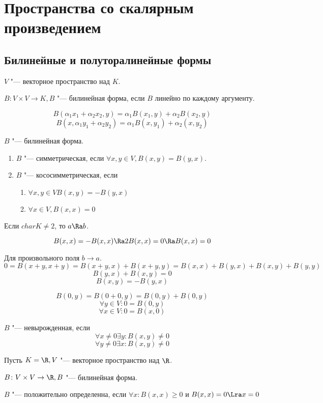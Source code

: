 \chapter{Пространства со скалярным произведением}
\section{Билинейные и полуторалинейные формы}
\begin{Def}
$V$ "--- векторное пространство над $K$. 

$B \colon V \times V \to K, B$ "--- билинейная форма, 
если $B$ линейно по каждому аргументу.

$$B(\alpha_1 x_1 + \alpha_2 x_2, y) = \alpha_1 B(x_1, y) + \alpha_2 B(x_2, y)$$
$$B(x, \alpha_1y_1 + \alpha_2 y_2) = \alpha_1 B(x, y_1) + \alpha_2(x, y_2)$$
\end{Def}
\begin{Def}
$B$ "--- билинейная форма.
    \begin{enumerate}
    \item $B$ "--- симметрическая, если $\forall x, y \in V, B(x, y) = B(y, x)$.
    \item $B$ "--- кососимметрическая, если 
        \begin{enumerate}
        \item $\forall x, y \in V B(x, y) = -B(y, x)$
        \item $\forall x \in V, B(x, x) = 0$
        \end{enumerate}
    \end{enumerate}
\end{Def}
\begin{Rem}
Если $char K \ne 2$, то  $a \Ra b$.

$$B(x, x) = -B(x, x) \Ra 2B(x, x) = 0 \Ra B(x, x) = 0$$
\end{Rem}
\begin{Rem}
Для произвольного поля $b \to a$.
$$0 = B(x + y, x + y) = B(x + y, x) + B(x + y, y) = B(x, x) + B(y, x) + B(x, y) + B(y, y)$$
$$B(y, x) + B(x, y) = 0$$
$$B(x, y) = -B(y, x)$$

$$B(0, y) = B(0 + 0, y) = B(0, y) + B(0, y)$$
$$\forall y \in V \colon 0 = B(0, y)$$
$$\forall x \in V \colon 0 = B(x, 0)$$
\end{Rem}

\begin{Def}
$B$ "--- невырожденная, если 
$$\forall x \ne 0 \exists y \colon B(x, y) \ne 0$$
$$\forall y \ne 0 \exists x \colon B(x, y) \ne 0$$
\end{Def}
\begin{Def}
Пусть $K = \R, V$ "--- векторное пространство над $\R$.

$B \colon V \times V \to \R, B$ "--- билинейная форма.

$B$ "--- положительно определенна, если 
$\forall x\colon B(x, x) \ge 0$ и $B(x, x) = 0 \Lra x = 0$
\end{Def}

